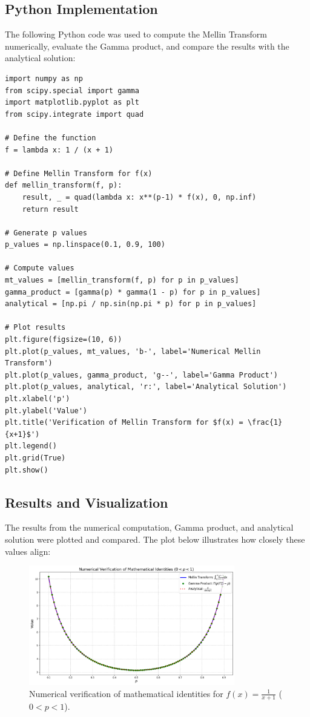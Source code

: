 \documentclass[a4paper, 12pt]{article}
\begin{document}
\subsection{Python Implementation}
The following Python code was used to compute the Mellin Transform numerically, evaluate the Gamma product, and compare the results with the analytical solution:
\begin{lstlisting}[style=pythonstyle]
import numpy as np
from scipy.special import gamma
import matplotlib.pyplot as plt
from scipy.integrate import quad

# Define the function
f = lambda x: 1 / (x + 1)

# Define Mellin Transform for f(x)
def mellin_transform(f, p):
    result, _ = quad(lambda x: x**(p-1) * f(x), 0, np.inf)
    return result

# Generate p values
p_values = np.linspace(0.1, 0.9, 100)

# Compute values
mt_values = [mellin_transform(f, p) for p in p_values]
gamma_product = [gamma(p) * gamma(1 - p) for p in p_values]
analytical = [np.pi / np.sin(np.pi * p) for p in p_values]

# Plot results
plt.figure(figsize=(10, 6))
plt.plot(p_values, mt_values, 'b-', label='Numerical Mellin Transform')
plt.plot(p_values, gamma_product, 'g--', label='Gamma Product')
plt.plot(p_values, analytical, 'r:', label='Analytical Solution')
plt.xlabel('p')
plt.ylabel('Value')
plt.title('Verification of Mellin Transform for $f(x) = \frac{1}{x+1}$')
plt.legend()
plt.grid(True)
plt.show()
\end{lstlisting}

\subsection{Results and Visualization}
The results from the numerical computation, Gamma product, and analytical solution were plotted and compared. The plot below illustrates how closely these values align:

\begin{figure}[H]
    \centering
    \includegraphics[width=0.8\textwidth]{Example.png}
    \caption{Numerical verification of mathematical identities for $f(x) = \frac{1}{x+1}$ ($0 < p < 1$).}
    \label{fig:mellin_identity}
\end{figure}
\end{document}
